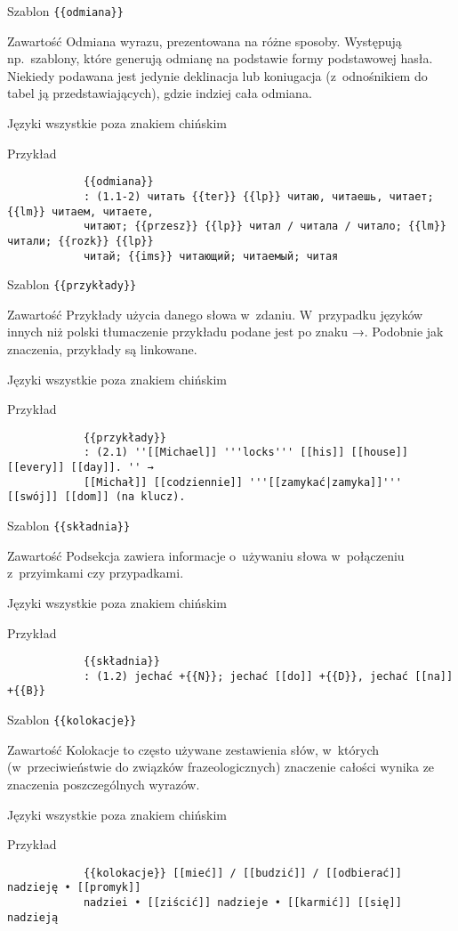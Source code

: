 \documentclass{pracamgr}
\begin{document}
\spacer
\begin{opis}
	\item[Szablon] \verb|{{odmiana}}|
	\item[Zawartość] Odmiana wyrazu, prezentowana na różne sposoby. Występują np.\ szablony, które generują odmianę na podstawie formy podstawowej hasła. Niekiedy podawana jest jedynie deklinacja lub koniugacja (z~odnośnikiem do tabel ją przedstawiających), gdzie indziej cała odmiana.
	\item[Języki] wszystkie poza znakiem chińskim
	\item[Przykład]
		\begin{verbatim}
			{{odmiana}}
			: (1.1-2) читать {{ter}} {{lp}} читаю, читаешь, читает; {{lm}} читаем, читаете,
			читают; {{przesz}} {{lp}} читал / читала / читало; {{lm}} читали; {{rozk}} {{lp}}
			читай; {{ims}} читающий; читаемый; читая
		\end{verbatim}
\end{opis}
\spacer
\begin{opis}
	\item[Szablon] \verb|{{przykłady}}|
	\item[Zawartość] Przykłady użycia danego słowa w~zdaniu. W~przypadku języków innych niż polski tłumaczenie przykładu podane jest po znaku →. Podobnie jak znaczenia, przykłady są linkowane.
	\item[Języki] wszystkie poza znakiem chińskim
	\item[Przykład]
		\begin{verbatim}
			{{przykłady}}
			: (2.1) ''[[Michael]] '''locks''' [[his]] [[house]] [[every]] [[day]]. '' →
			[[Michał]] [[codziennie]] '''[[zamykać|zamyka]]''' [[swój]] [[dom]] (na klucz).
		\end{verbatim}
\end{opis}
\spacer
\begin{opis}
	\item[Szablon] \verb|{{składnia}}|
	\item[Zawartość] Podsekcja zawiera informacje o~używaniu słowa w~połączeniu z~przyimkami czy przypadkami.
	\item[Języki] wszystkie poza znakiem chińskim
	\item[Przykład]
		\begin{verbatim}
			{{składnia}}
			: (1.2) jechać +{{N}}; jechać [[do]] +{{D}}, jechać [[na]] +{{B}}
		\end{verbatim}
\end{opis}
\spacer
\begin{opis}
	\item[Szablon] \verb|{{kolokacje}}|
	\item[Zawartość] Kolokacje to często używane zestawienia słów, w~których (w~przeciwieństwie do związków frazeologicznych) znaczenie całości wynika ze znaczenia poszczególnych wyrazów.
	\item[Języki] wszystkie poza znakiem chińskim
	\item[Przykład]
		\begin{verbatim}
			{{kolokacje}} [[mieć]] / [[budzić]] / [[odbierać]] nadzieję • [[promyk]]
			nadziei • [[ziścić]] nadzieje • [[karmić]] [[się]] nadzieją
		\end{verbatim}
\end{opis}
\end{document}
